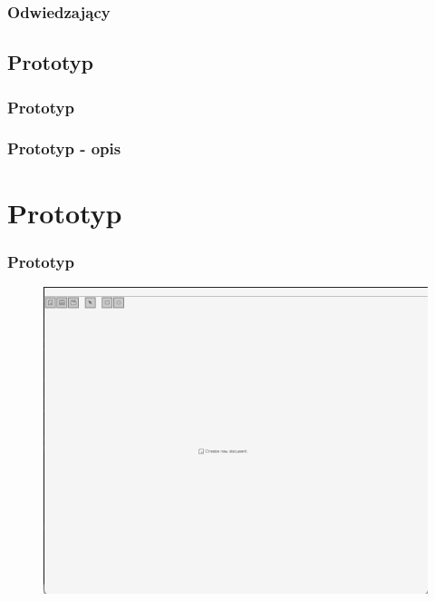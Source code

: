 \documentclass[
	11pt,]{beamer}
\begin{document}
\begin{frame}
	\frametitle{Odwiedzający}
	
\end{frame}

\subsection{Prototyp}

\begin{frame}
	\frametitle{Prototyp}
	\begin{figure}
	\end{figure}
\end{frame}

\begin{frame}
	\frametitle{Prototyp - opis}

\end{frame}


\section{Prototyp}

\begin{frame}
	\frametitle{Prototyp}
	
	\begin{figure}
		\includegraphics[height=0.7\textheight]{figures/pro1.png}
	\end{figure}
\end{frame}
\end{document}

